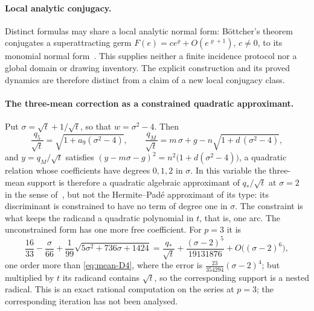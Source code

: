 \paragraph{Local analytic conjugacy.}
Distinct formulas may share a local analytic normal form: B\"ottcher's theorem conjugates a
superattracting germ $F(e)=ce^{\varrho}+O(e^{\varrho+1})$, $c\neq0$, to its monomial normal form~\cite{buff}. This
supplies neither a finite incidence protocol nor a global domain or drawing inventory. The explicit
construction and its proved dynamics are therefore distinct from a claim of a new local conjugacy class.

\paragraph{The three-mean correction as a constrained quadratic approximant.}
Put $\sigma=\sqrt t+1/\sqrt t$, so that $w=\sigma^{2}-4$. Then
\[ \frac{q_5}{\sqrt t}=\sqrt{1+a_9(\sigma^{2}-4)},\qquad
\frac{q_M}{\sqrt t}=m\,\sigma+g-n\sqrt{1+d\,(\sigma^{2}-4)} , \]
and $y=q_M/\sqrt t$ satisfies $(y-m\sigma-g)^{2}=n^{2}\bigl(1+d(\sigma^{2}-4)\bigr)$, a quadratic
relation whose coefficients have degrees $0,1,2$ in $\sigma$. In this variable the three-mean support
is therefore a quadratic algebraic approximant of $q_*/\sqrt t$ at $\sigma=2$ in the sense
of~\cite{shafer}, but not the Hermite--Pad\'e approximant of its type: its discriminant is constrained to
have no term of degree one in $\sigma$. The constraint is what keeps the radicand a quadratic
polynomial in $t$, that is, one arc. The unconstrained form has one more free coefficient. For $p=3$
it is
\[ \frac{16}{33}-\frac{\sigma}{66}+\frac1{99}\sqrt{5\sigma^{2}+736\sigma+1424}
=\frac{q_*}{\sqrt t}+\frac{(\sigma-2)^{5}}{19131876}+O\bigl((\sigma-2)^{6}\bigr), \]
one order more than \eqref{eq:mean-D4}, where the error is $\tfrac{23}{354294}(\sigma-2)^{4}$; but
multiplied by $t$ its radicand contains $\sqrt t$, so the corresponding support is a nested radical.
This is an exact rational computation on the series at $p=3$; the corresponding iteration has not been
analysed.

